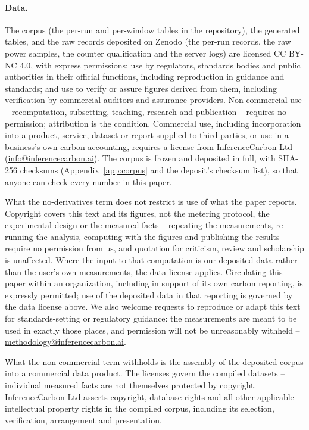 \documentclass[11pt]{article}
\begin{document}
\paragraph{Data.} The corpus (the per-run and per-window tables in the repository), the generated tables, and the raw records deposited on Zenodo (the per-run records, the raw power samples, the counter qualification and the server logs) are licensed CC BY-NC 4.0, with express permissions: use by regulators, standards bodies and public authorities in their official functions, including reproduction in guidance and standards; and use to verify or assure figures derived from them, including verification by commercial auditors and assurance providers. Non-commercial use -- recomputation, subsetting, teaching, research and publication -- requires no permission; attribution is the condition. Commercial use, including incorporation into a product, service, dataset or report supplied to third parties, or use in a business's own carbon accounting, requires a license from InferenceCarbon Ltd (\href{mailto:info@inferencecarbon.ai}{info@inferencecarbon.ai}). The corpus is frozen and deposited in full, with SHA-256 checksums (Appendix~\ref{app:corpus} and the deposit's checksum list), so that anyone can check every number in this paper.

What the no-derivatives term does not restrict is use of what the paper reports. Copyright covers this text and its figures, not the metering protocol, the experimental design or the measured facts -- repeating the measurements, re-running the analysis, computing with the figures and publishing the results require no permission from us, and quotation for criticism, review and scholarship is unaffected. Where the input to that computation is our deposited data rather than the user's own measurements, the data license applies. Circulating this paper within an organization, including in support of its own carbon reporting, is expressly permitted; use of the deposited data in that reporting is governed by the data license above. We also welcome requests to reproduce or adapt this text for standards-setting or regulatory guidance: the measurements are meant to be used in exactly those places, and permission will not be unreasonably withheld -- \href{mailto:methodology@inferencecarbon.ai}{methodology@inferencecarbon.ai}.

What the non-commercial term withholds is the assembly of the deposited corpus into a commercial data product. The licenses govern the compiled datasets -- individual measured facts are not themselves protected by copyright. InferenceCarbon Ltd asserts copyright, database rights and all other applicable intellectual property rights in the compiled corpus, including its selection, verification, arrangement and presentation.
\end{document}
